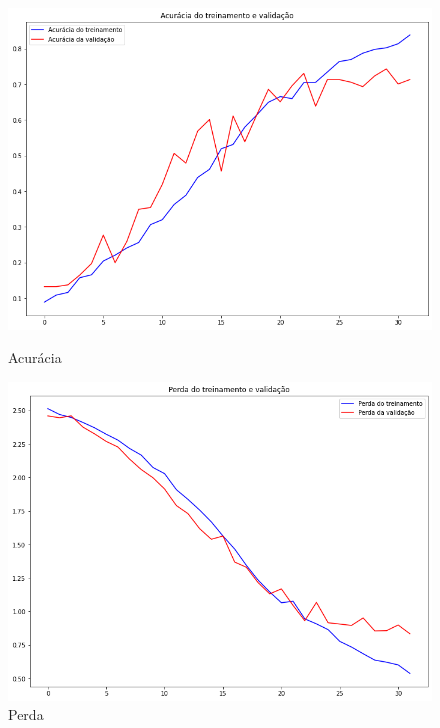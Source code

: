 \documentclass[12pt]{article}
\begin{document}
\begin{figure}[!htb]
  \begin{minipage}{.47\textwidth}
    \centering
    \includegraphics[width=1.1\linewidth]{experiments/default_noaug_32/accuracy.png}
    \caption{Acurácia}\label{fig:experiment_default_noaug_32_accuracy}
  \end{minipage}\hfill
  \begin{minipage}{.47\textwidth}
    \centering
    \includegraphics[width=1.1\linewidth]{experiments/default_noaug_32/loss.png}
    \caption{Perda}\label{fig:experiment_default_noaug_32_loss}
  \end{minipage}
\end{figure}
\end{document}
